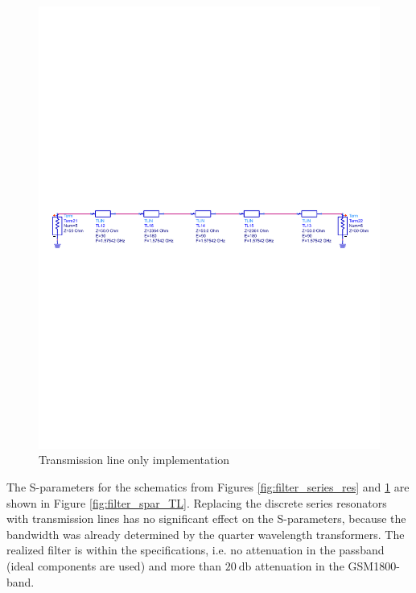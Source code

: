 \documentclass[a4paper]{article}        %
\begin{document}
  \begin{figure}[H]
    \centering
    \includegraphics[width=\textwidth]{fig/Filter/2nd_order/bandpass_series_res_to_TL.pdf}
    \caption{Transmission line only implementation}
    \label{fig:filter_transmission_line}
  \end{figure}

  The S-parameters for the schematics from Figures \ref{fig:filter_series_res} and \ref{fig:filter_transmission_line} are shown in Figure \ref{fig:filter_spar_TL}. Replacing the discrete series resonators with transmission lines has no significant effect on the S-parameters, because the bandwidth was already determined by the quarter wavelength transformers. The realized filter is within the specifications, i.e. no attenuation in the passband (ideal components are used) and more than $\SI{20}{\decibel}$ attenuation in the GSM1800-band.  
\end{document}
